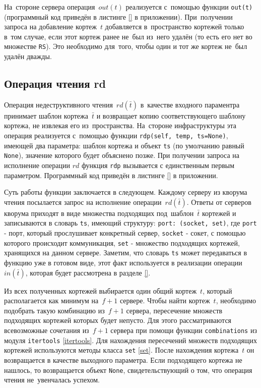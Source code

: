 На~стороне сервера операция~$out(t)$ реализуется с~помощью функции \texttt{out(t)} (программный код приведён в листинге \ref{} в приложении). При~получении запроса на добавление кортеж~$t$ добавляется в~пространство кортежей только в~том случае, если этот кортеж ранее не~был из~него удалён (то есть его нет во множестве \texttt{RS}). Это необходимо для~того, чтобы один и тот же кортеж не~был удалён дважды.

\subsection{Операция чтения rd}\label{subsec:7}
Операция недеструктивного чтения~$rd(\bar t)$ в~качестве входного параментра принимает шаблон кортежа~$\bar t$ и возвращает копию соответствующего шаблону кортежа, не извлекая его из~пространства. На~стороне инфраструктуры эта операция реализуется с~помощью функции \texttt{rdp(self, temp, ts=None)}, имеющей два параметра: шаблон кортежа и объект \texttt{ts} (по умолчанию равный \texttt{None}), значение которого будет объяснено позже. При получении запроса на исполнение операции $rd$ функция \texttt{rdp} вызывается с единственным первым параметром. Программный код приведён в листинге \ref{} в приложении.

Суть работы функции заключается в следующем. Каждому серверу из кворума чтения посылается запрос на исполнение операции~$rd(\bar t)$. Ответы от серверов кворума приходят в виде множества подходящих под~шаблон~$\bar t$ кортежей и записываются в словарь \texttt{ts}, имеющий структуру: \texttt{port: (socket, set)}, где \texttt{port} - порт, который прослушивает конкретный сервер, \texttt{socket} - сокет, с помощью которого происходит коммуникация, \texttt{set} - множество подходящих кортежей, хранящихся на данном сервере. Заметим, что словарь \texttt{ts} может передаваться в функцию уже в готовом виде, этот факт используется в реализации операции~$in(\bar t)$, которая будет рассмотрена в разделе \ref{}.

Из всех полученных кортежей выбирается один общий кортеж~$t$, который располагается как минимум на~$f + 1$ сервере. Чтобы найти кортеж~$t$, необходимо подобрать такую комбинацию из~$f + 1$ сервера, пересечение множеств подходящих кортежей которых будет непусто. Для этого рассматриваются всевозможные сочетания из~$f + 1$ сервера при помощи функции \texttt{combinations} из модуля \texttt{itertools} \ref{itertools}. Для нахождения пересечений множеств подходящих кортежей используются методы класса \texttt{set} \ref{set}. После нахождения кортежа~$t$ он возвращается в качестве выходного параметра. Если подходящего кортежа не нашлось, то возвращается объект \texttt{None}, свидетельствующий о том, что операция чтения не~увенчалась успехом.

